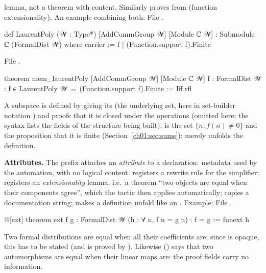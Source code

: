 lemma, not a theorem with content. Similarly  proves  from
 (function extensionality). An example combining both:
\noindent File .
\begin{leancode}
def LaurentPoly (𝒲 : Type*) [AddCommGroup 𝒲] [Module ℂ 𝒲] : Submodule ℂ (FormalDist 𝒲) where
  carrier := {f | (Function.support f).Finite}
\end{leancode}
\noindent File .
\begin{leancode}
theorem mem_laurentPoly [AddCommGroup 𝒲] [Module ℂ 𝒲] {f : FormalDist 𝒲} :
    f ∈ LaurentPoly 𝒲 ↔ (Function.support f).Finite := Iff.rfl
\end{leancode}
A subspace is defined by giving its  (the underlying set, here in set-builder notation
) and proofs that it is closed under the operations (omitted here; the 
syntax lists the fields of the structure being built).  is the set
$\{n : f(n)\ne0\}$ and  the proposition that it is finite (Section~\ref{ch01:sec:sums});
 merely unfolds the definition.

\textbf{Attributes.} The prefix  attaches an \emph{attribute} to a declaration: metadata
used by the automation, with no logical content.  registers a rewrite rule for the
simplifier;  registers an \emph{extensionality} lemma, i.e.\ a theorem ``two objects are
equal when their components agree'', which the tactic  then applies automatically;
 copies a documentation string;  makes a definition unfold like
an . Example:
\noindent File .
\begin{leancode}
@[ext]
theorem ext {f g : FormalDist 𝒲} (h : ∀ n, f n = g n) : f = g := funext h
\end{leancode}
Two formal distributions are equal when all their coefficients are; since  is opaque,
this has to be stated (and is proved by ). Likewise 
() says that two automorphisms are equal when their
linear maps are: the proof fields carry no information.

